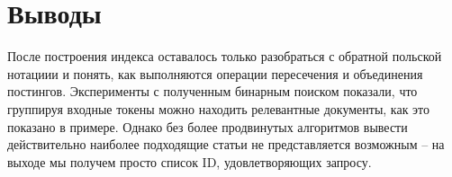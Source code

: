 \section{Выводы}

После построения индекса оставалось только разобраться с обратной польской нотациии и понять, как выполняются операции пересечения и объединения постингов. Эксперименты с полученным бинарным поиском показали, что группируя входные токены можно находить релевантные документы, как это показано в примере. Однако без более продвинутых алгоритмов вывести действительно наиболее подходящие статьи не представляется возможным -- на выходе мы получем просто список ID, удовлетворяющих запросу.

\pagebreak
